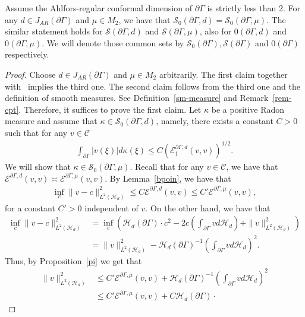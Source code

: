 \documentclass[AHL,Unicode,longabstracts,published]{cedram}
\newcommand{\ce}{\mathcal{E}}
\newcommand{\cs}{\mathcal{S}}
\newcommand{\ch}{\mathcal{H}}
\newcommand{\cC}{\mathcal{C}}
\begin{document}
\begin{theo}\label{s}
Assume the Ahlfors-regular conformal dimension of $\partial\Gamma$ is strictly less than 2. For any $d\in J_{AR}(\partial\Gamma)$ and $\mu\in M_2$, we have that $\cs_0(\partial\Gamma,d)=\cs_0(\partial\Gamma,\mu)$. The similar statement holds for $\cs(\partial\Gamma,d)$ and $\cs(\partial\Gamma,\mu)$, also for $0(\partial\Gamma,d)$ and $0(\partial\Gamma,\mu)$. We will denote those common sets by $\cs_0(\partial\Gamma), \cs(\partial\Gamma)$ and $0(\partial\Gamma)$ respectively.
\end{theo}

\begin{proof}
Choose $d\in J_{AR}(\partial\Gamma)$ and $\mu\in M_2$ arbitrarily.
The first claim together with~\cite[Theorem~2.2.3]{FOT} implies the third one. The second claim follows from the third one and the definition of smooth measures. See Definition~\ref{sm-measure} and Remark~\ref{rem-cpt}. Therefore, it suffices to prove the first claim. Let $\kappa$ be a positive Radon measure and assume that $\kappa\in\cs_0(\partial\Gamma,d)$, namely, there exists a constant $C>0$ such that for any $v\in\cC$
\begin{align}\label{nuh}
\int_{\partial\Gamma}|v(\xi)|d\kappa(\xi)\leq C\left(\ce^{\partial\Gamma,d}_1(v,v)\right)^{1/2}.
\end{align}
We will show that $\kappa\in\cs_0(\partial\Gamma,\mu)$. Recall that for any $v\in\cC$, we have that $\ce^{\partial\Gamma,d}(v,v)\asymp \ce^{\partial\Gamma,\mu}(v,v)$. By Lemma~\ref{bpoin}, we have that
\begin{align*}
\inf_{c}\|v-c\|^2_{L^2(\ch_{d})}\leq C\ce^{\partial\Gamma,d}(v,v)\leq C'\ce^{\partial\Gamma,\mu}(v,v),
\end{align*}
for a constant $C'>0$ independent of $v$. On the other hand, we have that
\begin{align*}
\inf_{c}\|v-c\|^2_{L^2(\ch_{d})}&=\inf_c\left(\ch_{d}(\partial\Gamma)\cdot c^2-2c\left(\int_{\partial\Gamma}vd\ch_{d}\right)+\|v\|^2_{L^2(\ch_{d})}\right)\\
&=\|v\|^2_{L^2(\ch_{d})}-\ch_{d}(\partial\Gamma)^{-1}\left(\int_{\partial\Gamma}vd\ch_{d}\right)^2.
\end{align*}
Thus, by Proposition~\ref{pi} we get that
\begin{align*}
\|v\|^2_{L^2(\ch_{d})}&\leq C'\ce^{\partial\Gamma,\mu}(v,v)+\ch_{d}(\partial\Gamma)^{-1}\left(\int_{\partial\Gamma}vd\ch_{d}\right)^2
\\
&\leq C'\ce^{\partial\Gamma,\mu}(v,v)+C\ch_{d}(\partial\Gamma)\cdot

\end{align*}
\end{proof}
\end{document}
